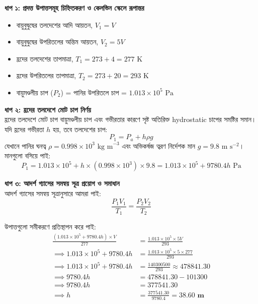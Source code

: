 \documentclass[12pt, a4paper]{article}
\begin{document}
\begin{tcolorbox}[solutionbox={সমাধান (Solution)}]
    \noindent
    \textbf{ধাপ ১: প্রদত্ত উপাত্তসমূহ চিহ্নিতকরণ ও কেলভিন স্কেলে রূপান্তর}
    \begin{itemize}[leftmargin=1.5em, itemsep=0.2em]
        \item বায়ুবুদ্বুদ্বের তলদেশের আদি আয়তন, $V_1 = V$
        \item বায়ুবুদ্বুদ্বের উপরিতলের অন্তিম আয়তন, $V_2 = 5V$
        \item হ্রদের তলদেশের তাপমাত্রা, $T_1 = 273 + 4 = 277\text{ K}$
        \item হ্রদের উপরিতলের তাপমাত্রা, $T_2 = 273 + 20 = 293\text{ K}$
        \item বায়ুমণ্ডলীয় চাপ ($P_2$) = পানির উপরিতলে চাপ = $1.013 \times 10^5\text{ Pa}$
    \end{itemize}
    
    \vspace{0.4em}
    \noindent\textbf{ধাপ ২: হ্রদের তলদেশে মোট চাপ নির্ণয়} \\
    হ্রদের তলদেশে মোট চাপ বায়ুমণ্ডলীয় চাপ এবং গভীরতার কারণে সৃষ্ট অতিরিক্ত hydrostatic চাপের সমষ্টির সমান। যদি হ্রদের গভীরতা $h$ হয়, তবে তলদেশের চাপ:
    \[ P_1 = P_a + h \rho g \]
    যেখানে পানির ঘনত্ব $\rho = 0.998 \times 10^3\text{ kg m}^{-3}$ এবং অভিকর্ষজ ত্বরণ নির্দেশক মান $g = 9.8\text{ m s}^{-2}$।
    মানগুলো বসিয়ে পাই:
    \[ P_1 = 1.013 \times 10^5 + h \times (0.998 \times 10^3) \times 9.8 = 1.013 \times 10^5 + 9780.4h\text{ Pa} \]
    
    \vspace{0.4em}
    \noindent\textbf{ধাপ ৩: আদর্শ গ্যাসের সমন্বয় সূত্র প্রয়োগ ও সমাধান} \\
    আদর্শ গ্যাসের সমন্বয় সূত্রানুসারে আমরা পাই:
    \[ \frac{P_1 V_1}{T_1} = \frac{P_2 V_2}{T_2} \]
    
    উপাত্তগুলো সমীকরণে প্রতিস্থাপন করে পাই:
    \begin{align*}
        \frac{(1.013 \times 10^5 + 9780.4h) \times V}{277} &= \frac{1.013 \times 10^5 \times 5V}{293} \\
        \implies 1.013 \times 10^5 + 9780.4h &= \frac{1.013 \times 10^5 \times 5 \times 277}{293} \\
        \implies 1.013 \times 10^5 + 9780.4h &= \frac{140300500}{293} \approx 478841.30 \\
        \implies 9780.4h &= 478841.30 - 101300 \\
        \implies 9780.4h &= 377541.30 \\
        \implies h &= \frac{377541.30}{9780.4} = \mathbf{38.60\text{ m}}
    \end{align*}
\end{tcolorbox}
\end{document}
